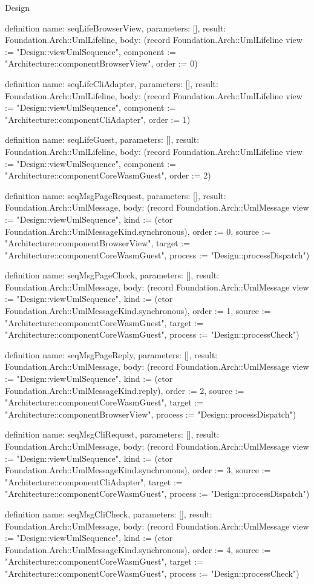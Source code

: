 \begin{lexlean}{Design}
\begin{semanticmodule}
definition{
  name: seqLifeBrowserView,
  parameters: [],
  result: Foundation.Arch::UmlLifeline,
  body: (record Foundation.Arch::UmlLifeline {view := "Design::viewUmlSequence", component := "Architecture::componentBrowserView", order := 0})
}

definition{
  name: seqLifeCliAdapter,
  parameters: [],
  result: Foundation.Arch::UmlLifeline,
  body: (record Foundation.Arch::UmlLifeline {view := "Design::viewUmlSequence", component := "Architecture::componentCliAdapter", order := 1})
}

definition{
  name: seqLifeGuest,
  parameters: [],
  result: Foundation.Arch::UmlLifeline,
  body: (record Foundation.Arch::UmlLifeline {view := "Design::viewUmlSequence", component := "Architecture::componentCoreWasmGuest", order := 2})
}

definition{
  name: seqMsgPageRequest,
  parameters: [],
  result: Foundation.Arch::UmlMessage,
  body: (record Foundation.Arch::UmlMessage {view := "Design::viewUmlSequence", kind := (ctor Foundation.Arch::UmlMessageKind.synchronous), order := 0, source := "Architecture::componentBrowserView", target := "Architecture::componentCoreWasmGuest", process := "Design::processDispatch"})
}

definition{
  name: seqMsgPageCheck,
  parameters: [],
  result: Foundation.Arch::UmlMessage,
  body: (record Foundation.Arch::UmlMessage {view := "Design::viewUmlSequence", kind := (ctor Foundation.Arch::UmlMessageKind.synchronous), order := 1, source := "Architecture::componentCoreWasmGuest", target := "Architecture::componentCoreWasmGuest", process := "Design::processCheck"})
}

definition{
  name: seqMsgPageReply,
  parameters: [],
  result: Foundation.Arch::UmlMessage,
  body: (record Foundation.Arch::UmlMessage {view := "Design::viewUmlSequence", kind := (ctor Foundation.Arch::UmlMessageKind.reply), order := 2, source := "Architecture::componentCoreWasmGuest", target := "Architecture::componentBrowserView", process := "Design::processDispatch"})
}

definition{
  name: seqMsgCliRequest,
  parameters: [],
  result: Foundation.Arch::UmlMessage,
  body: (record Foundation.Arch::UmlMessage {view := "Design::viewUmlSequence", kind := (ctor Foundation.Arch::UmlMessageKind.synchronous), order := 3, source := "Architecture::componentCliAdapter", target := "Architecture::componentCoreWasmGuest", process := "Design::processDispatch"})
}

definition{
  name: seqMsgCliCheck,
  parameters: [],
  result: Foundation.Arch::UmlMessage,
  body: (record Foundation.Arch::UmlMessage {view := "Design::viewUmlSequence", kind := (ctor Foundation.Arch::UmlMessageKind.synchronous), order := 4, source := "Architecture::componentCoreWasmGuest", target := "Architecture::componentCoreWasmGuest", process := "Design::processCheck"})
}


\end{semanticmodule}
\end{lexlean}
